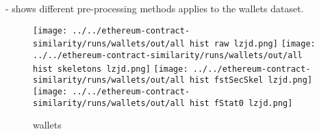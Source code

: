 \documentclass[../main.tex]{subfiles}
\begin{document}

\hyp{
   shows different pre-processing methods applies to the wallets dataset.
}

\begin{figure}[ht!]
  \centering
  \texttt{[image: ../../ethereum-contract-similarity/runs/wallets/out/all hist raw lzjd.png]}%
  \texttt{[image: ../../ethereum-contract-similarity/runs/wallets/out/all hist skeletons lzjd.png]}%
  \texttt{[image: ../../ethereum-contract-similarity/runs/wallets/out/all hist fstSecSkel lzjd.png]}%
  \texttt{[image: ../../ethereum-contract-similarity/runs/wallets/out/all hist fStat0 lzjd.png]}%
  \caption{wallets}
  \label{fig:hist_wallets_lzjd}
\end{figure}
\end{document}
